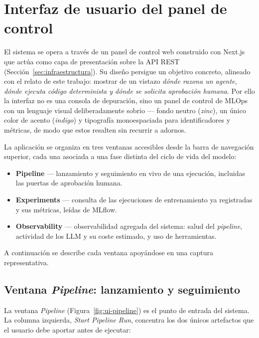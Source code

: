 \section{Interfaz de usuario del panel de control}
\label{anexo:interfaz}

El sistema se opera a través de un panel de control web construido con Next.js que
actúa como capa de presentación sobre la API REST (Sección~\ref{sec:infraestructura}).
Su diseño persigue un objetivo concreto, alineado con el relato de este trabajo:
mostrar de un vistazo \emph{dónde razona un agente, dónde ejecuta código determinista
y dónde se solicita aprobación humana}. Por ello la interfaz no es una consola de
depuración, sino un panel de control de MLOps con un lenguaje visual deliberadamente
sobrio --- fondo neutro (\textit{zinc}), un único color de acento (\textit{indigo}) y
tipografía monoespaciada para identificadores y métricas, de modo que estos resalten
sin recurrir a adornos.

La aplicación se organiza en tres ventanas accesibles desde la barra de navegación
superior, cada una asociada a una fase distinta del ciclo de vida del modelo:

\begin{itemize}
  \item \textbf{Pipeline} --- lanzamiento y seguimiento en vivo de una ejecución,
        incluidas las puertas de aprobación humana.
  \item \textbf{Experiments} --- consulta de las ejecuciones de entrenamiento ya
        registradas y sus métricas, leídas de MLflow.
  \item \textbf{Observability} --- observabilidad agregada del sistema: salud del
        \textit{pipeline}, actividad de los LLM y su coste estimado, y uso de
        herramientas.
\end{itemize}

A continuación se describe cada ventana apoyándose en una captura representativa.

\subsection{Ventana \textit{Pipeline}: lanzamiento y seguimiento}
\label{anexo:ui-pipeline}

La ventana \textit{Pipeline} (Figura~\ref{fig:ui-pipeline}) es el punto de entrada
del sistema. La columna izquierda, \textit{Start Pipeline Run}, concentra los dos
únicos artefactos que el usuario debe aportar antes de ejecutar:

